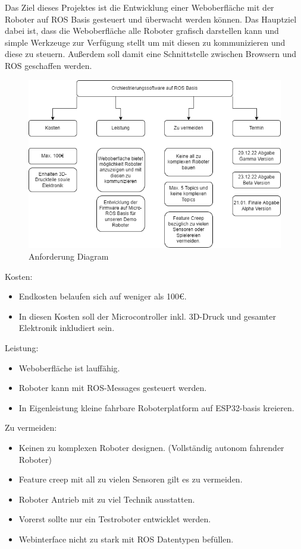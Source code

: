 \begin{flushleft}
    Das Ziel dieses Projektes ist die Entwicklung einer Weboberfläche mit der Roboter auf ROS Basis gesteuert und überwacht werden können.
    Das Hauptziel dabei ist, dass die Weboberfläche alle Roboter grafisch darstellen kann und simple Werkzeuge zur Verfügung stellt um mit diesen zu kommunizieren
    und diese zu steuern.
    Außerdem soll damit eine Schnittstelle zwischen Browsern und ROS geschaffen werden.
    

    \begin{figure}[h!]
        \centering
        \includegraphics[width=1\textwidth]{imgs/Zielsetzung.png}
        \caption{Anforderung Diagram}
        \label{fig:dia_anforderung}%
    \end{figure}

    Kosten:
    \begin{itemize}
    \item Endkosten belaufen sich auf weniger als 100€.
    \item In diesen Kosten soll der Microcontroller inkl. 3D-Druck und gesamter Elektronik inkludiert sein.
    \end{itemize}

    Leistung:
    \begin{itemize}
    \item Weboberfläche ist lauffähig.
    \item Roboter kann mit ROS-Messages gesteuert werden.
    \item In Eigenleistung kleine fahrbare Roboterplatform auf ESP32-basis kreieren.
    \end{itemize}
        
    Zu vermeiden:
    \begin{itemize}
    \item Keinen zu komplexen Roboter designen. (Vollständig autonom fahrender Roboter)
    \item Feature creep mit all zu vielen Sensoren gilt es zu vermeiden.
    \item Roboter Antrieb mit zu viel Technik ausstatten.
    \item Vorerst sollte nur ein Testroboter entwicklet werden.
    \item Webinterface nicht zu stark mit ROS Datentypen befüllen.
    \end {itemize}


\end{flushleft}
